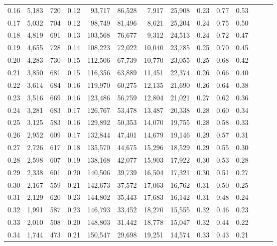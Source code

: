 \begin{tabular}{rrrrrrrrrrrrrr}
0.16 &  5,183 &  720 &  0.12 &   93,717 &   86,528 &   7,917 &  25,908 &  0.23 &  0.77 &      0.53 \\
0.17 &  5,032 &  704 &  0.12 &   98,749 &   81,496 &   8,621 &  25,204 &  0.24 &  0.75 &      0.50 \\
0.18 &  4,819 &  691 &  0.13 &  103,568 &   76,677 &   9,312 &  24,513 &  0.24 &  0.72 &      0.47 \\
0.19 &  4,655 &  728 &  0.14 &  108,223 &   72,022 &  10,040 &  23,785 &  0.25 &  0.70 &      0.45 \\
0.20 &  4,283 &  730 &  0.15 &  112,506 &   67,739 &  10,770 &  23,055 &  0.25 &  0.68 &      0.42 \\
0.21 &  3,850 &  681 &  0.15 &  116,356 &   63,889 &  11,451 &  22,374 &  0.26 &  0.66 &      0.40 \\
0.22 &  3,614 &  684 &  0.16 &  119,970 &   60,275 &  12,135 &  21,690 &  0.26 &  0.64 &      0.38 \\
0.23 &  3,516 &  669 &  0.16 &  123,486 &   56,759 &  12,804 &  21,021 &  0.27 &  0.62 &      0.36 \\
0.24 &  3,281 &  683 &  0.17 &  126,767 &   53,478 &  13,487 &  20,338 &  0.28 &  0.60 &      0.34 \\
0.25 &  3,125 &  583 &  0.16 &  129,892 &   50,353 &  14,070 &  19,755 &  0.28 &  0.58 &      0.33 \\
0.26 &  2,952 &  609 &  0.17 &  132,844 &   47,401 &  14,679 &  19,146 &  0.29 &  0.57 &      0.31 \\
0.27 &  2,726 &  617 &  0.18 &  135,570 &   44,675 &  15,296 &  18,529 &  0.29 &  0.55 &      0.30 \\
0.28 &  2,598 &  607 &  0.19 &  138,168 &   42,077 &  15,903 &  17,922 &  0.30 &  0.53 &      0.28 \\
0.29 &  2,338 &  601 &  0.20 &  140,506 &   39,739 &  16,504 &  17,321 &  0.30 &  0.51 &      0.27 \\
0.30 &  2,167 &  559 &  0.21 &  142,673 &   37,572 &  17,063 &  16,762 &  0.31 &  0.50 &      0.25 \\
0.31 &  2,129 &  620 &  0.23 &  144,802 &   35,443 &  17,683 &  16,142 &  0.31 &  0.48 &      0.24 \\
0.32 &  1,991 &  587 &  0.23 &  146,793 &   33,452 &  18,270 &  15,555 &  0.32 &  0.46 &      0.23 \\
0.33 &  2,010 &  508 &  0.20 &  148,803 &   31,442 &  18,778 &  15,047 &  0.32 &  0.44 &      0.22 \\
0.34 &  1,744 &  473 &  0.21 &  150,547 &   29,698 &  19,251 &  14,574 &  0.33 &  0.43 &      0.21 \\

\end{tabular}
